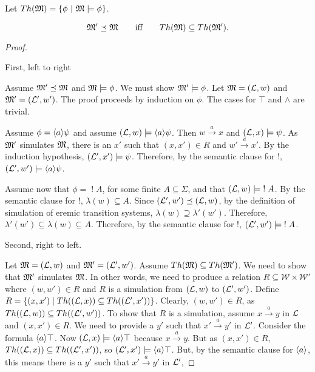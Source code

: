 \begin{definition}
Let $Th(\frak{M}) =  \{\phi\ |\ \frak{M} \models \phi \}$.
\end{definition}

\begin{theorem}
\[
\frak{M}' \preceq \frak{M}
\qquad\text{iff}\qquad
Th(\frak{M}) \subseteq Th(\frak{M}') .
\]
\end{theorem}

\begin{proof}
\begin{case}
First, left to right
\end{case}
Assume $\frak{M}' \preceq \frak{M}$ and $\frak{M} \models \phi$.
We must show $\frak{M}' \models \phi$.
Let $\frak{M} = (\mathcal{L}, w)$ and $\frak{M}' = (\mathcal{L}', w')$.
The proof proceeds by induction on $\phi$.
The cases for $\top$ and $\land$ are trivial.

Assume $\phi = \langle a \rangle \psi$ and assume  $(\mathcal{L}, w) \models  \langle a \rangle \psi$.
Then $w \xrightarrow{a} x$ and $(\mathcal{L}, x) \models  \psi$.
As $\frak{M}'$ simulates $\frak{M}$, there is an $x'$ such that $(x,x') \in R$ and $w' \xrightarrow{a} x'$.
By the induction hypothesis, $(\mathcal{L}', x') \models \psi$.
Therefore, by the semantic clause for $!$, $(\mathcal{L}', w') \models  \langle a \rangle \psi$.

Assume now that $\phi = \; ! \; A$, for some finite $A \subseteq \Sigma$, and that $(\mathcal{L}, w) \models \; ! \; A$.
By the semantic clause for $!$, $\lambda(w) \subseteq A$.
Since $(\mathcal{L}', w') \preceq (\mathcal{L}, w)$, by the definition of simulation of eremic transition systems, $\lambda(w) \supseteq \lambda'(w')$.
Therefore, $\lambda'(w') \subseteq \lambda(w) \subseteq A$.
Therefore, by the semantic clause for $!$, $(\mathcal{L}', w') \models  \; ! \; A$.

\begin{case}
Second, right to left.
\end{case}
Let $\frak{M} = (\mathcal{L}, w)$ and $\frak{M}' = (\mathcal{L}', w')$.
Assume $Th(\frak{M}) \subseteq Th(\frak{M}') $. We need to show that $\frak{M}'$ simulates $\frak{M}$.
In other words, we need to produce a relation $R \subseteq \mathcal{W} \times \mathcal{W}'$ where $(w,w') \in R$ and $R$ is a simulation from $(\mathcal{L}, w)$ to $ (\mathcal{L}', w')$.
Define $R = \{(x,x') \; | \; Th( (\mathcal{L}, x)) \subseteq Th( (\mathcal{L}', x'))\}$.
Clearly, $(w,w') \in R$, as $Th((\mathcal{L}, w)) \subseteq Th((\mathcal{L}', w')) $.
To show that $R$ is a simulation,  assume $x \xrightarrow{a} y$ in $\mathcal{L}$ and $(x,x') \in R$. We need to provide a $y'$ such that $x' \xrightarrow{a} y'$ in $\mathcal{L}'$.
Consider the formula $\langle a \rangle \top$. Now $(\mathcal{L}, x) \models \langle a \rangle \top$ because $x \xrightarrow{a} y$.
But as $(x,x') \in R$, $Th((\mathcal{L}, x)) \subseteq Th((\mathcal{L}', x')) $, so  $(\mathcal{L}', x') \models \langle a \rangle \top$.
But, by the semantic clause for $\MAY{a}$, this means there is a $y'$ such that $x' \xrightarrow{a} y'$ in $\mathcal{L}'$,


\end{proof}
